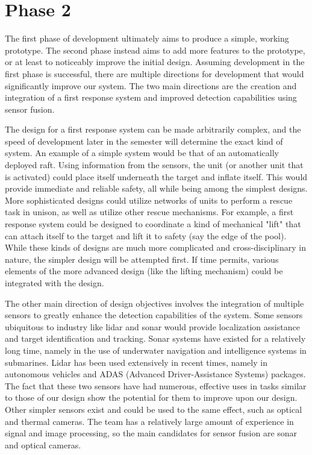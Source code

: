 \section{Phase 2}
The first phase of development ultimately aims to produce a simple, working prototype. The second phase instead aims to add more features to the prototype, or at least to noticeably improve the initial design. Assuming development in the first phase is successful, there are multiple directions for development that would significantly improve our system. The two main directions are the creation and integration of a first response system and improved detection capabilities using sensor fusion.

The design for a first response system can be made arbitrarily complex, and the speed of development later in the semester will determine the exact kind of system. An example of a simple system would be that of an automatically deployed raft. Using information from the sensors, the unit (or another unit that is activated) could place itself underneath the target and inflate itself. This would provide immediate and reliable safety, all while being among the simplest designs. More sophisticated designs could utilize networks of units to perform a rescue task in unison, as well as utilize other rescue mechanisms. For example, a first response system could be designed to coordinate a kind of mechanical "lift" that can attach itself to the target and lift it to safety (say the edge of the pool). While these kinds of designs are much more complicated and cross-disciplinary in nature, the simpler design will be attempted first. If time permits, various elements of the more advanced design (like the lifting mechanism) could be integrated with the design.

The other main direction of design objectives involves the integration of multiple sensors to greatly enhance the detection capabilities of the system. Some sensors ubiquitous to industry like lidar and sonar would provide localization assistance and target identification and tracking. Sonar systems have existed for a relatively long time, namely in the use of underwater navigation and intelligence systems in submarines. Lidar has been used extensively in recent times, namely in autonomous vehicles and ADAS (Advanced Driver-Assistance Systems) packages. The fact that these two sensors have had numerous, effective uses in tasks similar to those of our design show the potential for them to improve upon our design. Other simpler sensors exist and could be used to the same effect, such as optical and thermal cameras. The team has a relatively large amount of experience in signal and image processing, so the main candidates for sensor fusion are sonar and optical cameras.

